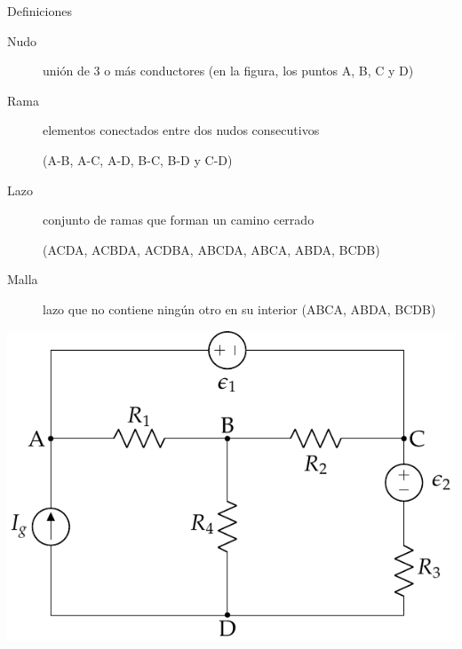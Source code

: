 \documentclass[aspectratio=169, xcolor={usenames,svgnames,dvipsnames}]{beamer}
\begin{document}
\begin{frame}{Definiciones} \label{definiciones_mallas}
    \begin{description}
        \item[{Nudo}] \hspace{2mm}unión de \alert{3} o más conductores \hspace{3mm}(en la figura, los puntos A, B, C y D)
        \item[{Rama}] \hspace{2mm}elementos conectados entre dos nudos consecutivos 
        
        \hspace{2mm}(A-B, A-C, A-D, B-C, B-D y C-D)
        \item[{Lazo}] \hspace{2mm}conjunto de ramas que forman un camino cerrado
        
        \hspace{2mm}(ACDA, ACBDA, ACDBA, ABCDA, ABCA, ABDA, BCDB)
        \item[{Malla}] \hspace{2mm}lazo que no contiene ningún otro en su interior 
        \hspace{3mm}(ABCA, ABDA, BCDB)
    \end{description}

    \begin{center}
        \includegraphics[height=0.5\textheight]{../figs/mallas.pdf}
    \end{center}
\end{frame}

\end{document}
